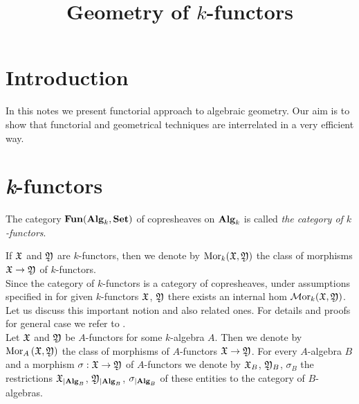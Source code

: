 


\title{Geometry of $k$-functors}
\date{}
\maketitle

\section{Introduction}
\noindent
In this notes we present functorial approach to algebraic geometry. Our aim is to show that functorial and geometrical techniques are interrelated in a very efficient way.

\section{\textit{k}-functors}

\begin{definition}
The category $\mathbf{Fun}(\mathbf{Alg}_k,\mathbf{Set})$ of copresheaves on $\mathbf{Alg}_k$ is called \textit{the category of $k$-functors}.
\end{definition}
\noindent
If ${\mathfrak X}$ and ${\mathfrak Y}$ are $k$-functors, then we denote by $\mathrm{Mor}_k({\mathfrak X},{\mathfrak Y})$ the class of morphisms ${\mathfrak X}\rightarrow {\mathfrak Y}$ of $k$-functors.\\
Since the category of $k$-functors is a category of copresheaves, under assumptions specified in {\cite[section 5]{Presheaves}} for given $k$-functors ${\mathfrak X}$, ${\mathfrak Y}$ there exists an internal hom $\mathcal{M}\mathrm{or}_k({\mathfrak X},{\mathfrak Y})$. Let us discuss this important notion and also related ones. For details and proofs for general case we refer to {\cite[section 5]{Presheaves}}.\\
Let ${\mathfrak X}$ and ${\mathfrak Y}$ be $A$-functors for some $k$-algebra $A$. Then we denote by $\mathrm{Mor}_A\left({\mathfrak X},{\mathfrak Y}\right)$ the class of morphisms of $A$-functors ${\mathfrak X}\rightarrow {\mathfrak Y}$. For every $A$-algebra $B$ and a morphism $\sigma:{\mathfrak X}\rightarrow {\mathfrak Y}$ of $A$-functors we denote by ${\mathfrak X}_{B}$, ${\mathfrak Y}_{B}$, $\sigma_{B}$ the restrictions ${\mathfrak X}_{\mid \mathbf{Alg}_B}$, ${\mathfrak Y}_{\mid \mathbf{Alg}_B}$, $\sigma_{\mid \mathbf{Alg}_B}$ of these entities to the category of $B$-algebras. 

